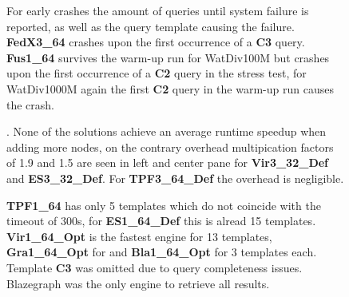 \documentclass[twocolumn]{bmcart}%
\def\texttt{[image: ]}
\begin{document}
\begin{backmatter}
\begin{figure}[ht!]
	\centering
	\caption{ For early crashes the amount of queries until system failure is reported, as well as the query template causing the failure. \textbf{FedX3\_64} crashes upon the first occurrence of a \textbf{C3} query. \textbf{Fus1\_64} survives the warm-up run for WatDiv100M but crashes upon the first occurrence of a \textbf{C2} query in the stress test, for WatDiv1000M again the first \textbf{C2} query in the warm-up run causes the crash.}
	\label{fig:Fig03_BenchmarkSurvival_Other_Watdiv_Default}
\end{figure}   

\begin{figure}[ht!]
	\centering
	\caption{. None of the solutions achieve an average runtime speedup when adding more nodes, on the contrary overhead multipication factors of 1.9 and 1.5 are seen in left and center pane for \textbf{Vir3\_32\_Def} and \textbf{ES3\_32\_Def}. For \textbf{TPF3\_64\_Def} the overhead is negligible.}
	\label{fig:Fig04_WatdivHorizontalScaling}
\end{figure}

\begin{figure}[ht!]
	\centering
	\caption{ \textbf{TPF1\_64} has only 5 templates which do not coincide with the timeout of 300s, for \textbf{ES1\_64\_Def} this is alread 15 templates.
		\textbf{Vir1\_64\_Opt} is the fastest engine for 13 templates, \textbf{Gra1\_64\_Opt} for and \textbf{Bla1\_64\_Opt} for 3 templates each. Template \textbf{C3} was omitted due to query completeness issues. Blazegraph was the only engine to retrieve all results. } 
	\label{fig:Fig05_WatdivTemplates}
\end{figure}
 

\end{backmatter}
\end{document}
